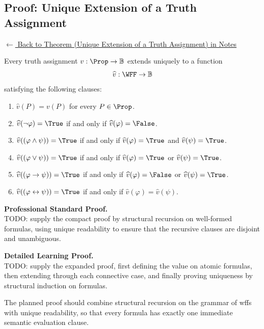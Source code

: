 \clearpage
\subsection*{Proof: Unique Extension of a Truth Assignment}
\label{prf:unique-extension-truth-assignment-propositional-logic}

\noindent\hyperref[thm:unique-extension-truth-assignment-propositional-logic]{$\leftarrow$ Back to Theorem (Unique Extension of a Truth Assignment) in Notes}

\begin{theorem*}
Every truth assignment $v:\Prop\to\mathbb{B}$ extends uniquely to a function
\[
\widehat v:\WFF\to\mathbb{B}
\]
satisfying the following clauses:
\begin{enumerate}
  \item $\widehat v(P)=v(P)$ for every $P\in\Prop$.
  \item $\widehat v(\neg\varphi)=\True$ if and only if
        $\widehat v(\varphi)=\False$.
  \item $\widehat v((\varphi\land\psi))=\True$ if and only if
        $\widehat v(\varphi)=\True$ and $\widehat v(\psi)=\True$.
  \item $\widehat v((\varphi\lor\psi))=\True$ if and only if
        $\widehat v(\varphi)=\True$ or $\widehat v(\psi)=\True$.
  \item $\widehat v((\varphi\to\psi))=\True$ if and only if
        $\widehat v(\varphi)=\False$ or $\widehat v(\psi)=\True$.
  \item $\widehat v((\varphi\leftrightarrow\psi))=\True$ if and only if
        $\widehat v(\varphi)=\widehat v(\psi)$.
\end{enumerate}
\end{theorem*}

\textbf{Professional Standard Proof.}~\\
TODO: supply the compact proof by structural recursion on well-formed formulas,
using unique readability to ensure that the recursive clauses are disjoint and
unambiguous.

\medskip

\textbf{Detailed Learning Proof.}~\\
TODO: supply the expanded proof, first defining the value on atomic formulas,
then extending through each connective case, and finally proving uniqueness by
structural induction on formulas.

\begin{remark*}
The planned proof should combine structural recursion on the grammar of wffs
with unique readability, so that every formula has exactly one immediate
semantic evaluation clause.
\end{remark*}

